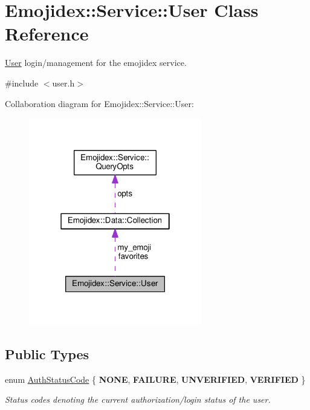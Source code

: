 \hypertarget{classEmojidex_1_1Service_1_1User}{}\section{Emojidex\+:\+:Service\+:\+:User Class Reference}
\label{classEmojidex_1_1Service_1_1User}


\hyperlink{classEmojidex_1_1Service_1_1User}{User} login/management for the emojidex service.  




{\ttfamily \#include $<$user.\+h$>$}



Collaboration diagram for Emojidex\+:\+:Service\+:\+:User\+:\nopagebreak
\begin{figure}[H]
\begin{center}
\leavevmode
\includegraphics[width=214pt]{classEmojidex_1_1Service_1_1User__coll__graph}
\end{center}
\end{figure}
\subsection*{Public Types}
\begin{DoxyCompactItemize}
\item 
enum \hyperlink{classEmojidex_1_1Service_1_1User_a01490eed8fcfc954284a058fea0a242b}{Auth\+Status\+Code} \{ {\bfseries N\+O\+NE}, 
{\bfseries F\+A\+I\+L\+U\+RE}, 
{\bfseries U\+N\+V\+E\+R\+I\+F\+I\+ED}, 
{\bfseries V\+E\+R\+I\+F\+I\+ED}
 \}\hypertarget{classEmojidex_1_1Service_1_1User_a01490eed8fcfc954284a058fea0a242b}{}\label{classEmojidex_1_1Service_1_1User_a01490eed8fcfc954284a058fea0a242b}
\begin{DoxyCompactList}\small\item\em Status codes denoting the current authorization/login status of the user. \end{DoxyCompactList}
\end{DoxyCompactItemize}

